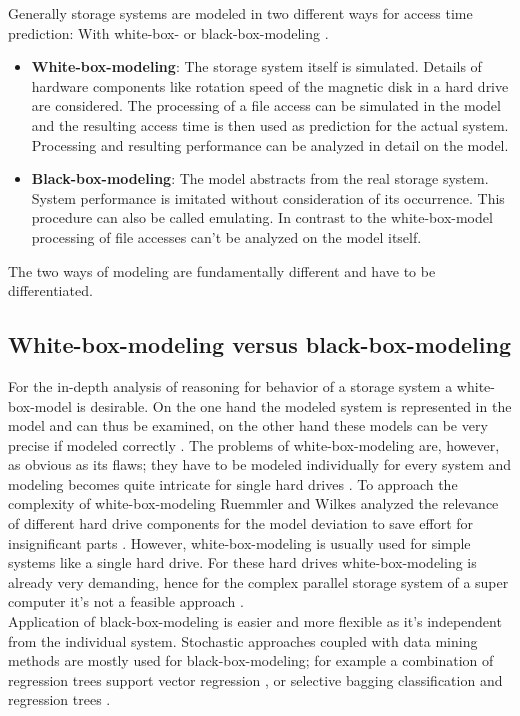 \documentclass{superfri}
\begin{document}
Generally storage systems are modeled in two different ways for access time prediction: With white-box- or black-box-modeling \cite{Crume:2013:FML:2538542.2538561}.
\begin{itemize}
	\item \textbf{White-box-modeling}: The storage system itself is simulated. Details of hardware components like rotation speed of the magnetic disk in a hard drive are considered. The processing of a file access can be simulated in the model and the resulting access time is then used as prediction for the actual system.
	Processing and resulting performance can be analyzed in detail on the model.
	\item \textbf{Black-box-modeling}: The model abstracts from the real storage system. 
	System performance is imitated without consideration of its occurrence. %
	This procedure can also be called emulating.
	In contrast to the white-box-model processing of file accesses can't be analyzed on the model itself.
\end{itemize}
The two ways of modeling are fundamentally different and have to be differentiated.

\subsection{White-box-modeling versus black-box-modeling}
For the in-depth analysis of reasoning for behavior of a storage system a white-box-model is desirable.
On the one hand the modeled system is represented in the model and can thus be examined, on the other hand these models can be very precise if modeled correctly \cite{Ruemmler94anintroduction}.
The problems of white-box-modeling are, however, as obvious as its flaws; they have to be modeled individually for every system and modeling becomes quite intricate for single hard drives \cite{Crume:2013:FML:2538542.2538561}.
To approach the complexity of white-box-modeling Ruemmler and Wilkes analyzed the relevance of different hard drive components for the model deviation to save effort for insignificant parts \cite{Ruemmler94anintroduction}.
However, white-box-modeling is usually used for simple systems like a single hard drive. For these hard drives white-box-modeling is already very demanding, hence for the complex parallel storage system of a super computer it's not a feasible approach \cite{DBLP:conf/npc/ZhangLZJC10}.\\

Application of black-box-modeling is easier and more flexible as it's independent from the individual system.
Stochastic approaches coupled with data mining methods are mostly used for black-box-modeling; for example a combination of regression trees support vector regression \cite{Dai:2012:SDP:2477169.2477214}, or selective bagging classification and regression trees \cite{DBLP:conf/npc/ZhangLZJC10}.
\end{document}
